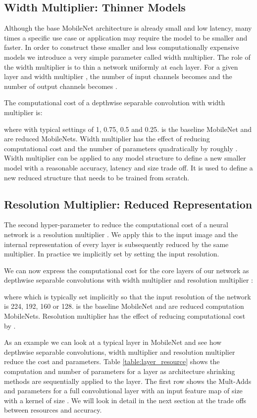 \documentclass[10pt,twocolumn,letterpaper]{article}
\begin{document}
\subsection{Width Multiplier: Thinner Models}

Although the base MobileNet architecture is already small and low latency, many times a specific use case or application may require the model to be smaller and faster. In order to construct these smaller and less computationally expensive models we introduce a very simple parameter  called width multiplier. The role of the width multiplier  is to thin a network uniformly at each layer. For a given layer and width multiplier , the number of input channels  becomes  and the number of output channels  becomes .

The computational cost of a depthwise separable convolution with width multiplier  is:  

where  with typical settings of 1, 0.75, 0.5 and 0.25.  is the baseline MobileNet and 
are reduced MobileNets. Width multiplier has the effect of reducing computational cost and the number of parameters quadratically by roughly . Width multiplier can be applied to any model structure to define a new smaller model with a reasonable accuracy, latency and size trade off. It is used to define a new reduced structure that needs to be trained from scratch.

\subsection{Resolution Multiplier: Reduced Representation}

The second hyper-parameter to reduce the computational cost of a neural network is a resolution multiplier . We apply this to the input image and the internal representation of every layer is subsequently reduced by the same multiplier. In practice we implicitly set  by setting the input resolution. 

We can now express the computational cost for the core layers of our network as depthwise separable convolutions with width multiplier  and resolution multiplier :

where  which is typically set implicitly so that the input resolution of the network is 224, 192, 160 or 128.  is the baseline MobileNet and 
are reduced computation MobileNets. Resolution multiplier has the effect of reducing computational cost by .

As an example we can look at a typical layer in MobileNet and see how depthwise separable convolutions, width multiplier and resolution multiplier reduce the cost and parameters. Table \ref{table:layer_resource} shows the computation and number of parameters for a layer as architecture shrinking methods are sequentially applied to the layer. The first row shows the Mult-Adds and parameters for a full convolutional layer with an input feature map of size  with a kernel  of size . We will look in detail in the next section at the trade offs between resources and accuracy.
\end{document}
